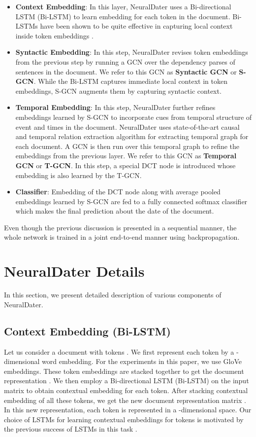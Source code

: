 \documentclass[11pt,a4paper]{article}
\newcommand{\method}{NeuralDater}
\begin{document}
\begin{itemize}
	\item \textbf{Context Embedding}: In this layer, \method{} uses a Bi-directional LSTM (Bi-LSTM) to learn embedding for each token in the document. Bi-LSTMs have been shown to be quite effective in capturing local context inside token embeddings \cite{Sutskever:2014:SSL:2969033.2969173}.
	\item \textbf{Syntactic Embedding}: In this step, \method{} revises token embeddings from the previous step by running a GCN over the dependency parses of sentences in the document. We refer to this GCN as \textbf{Syntactic GCN} or \textbf{S-GCN}. While the Bi-LSTM captures immediate local context in token embeddings, S-GCN augments them by capturing syntactic context. 
	\item \textbf{Temporal Embedding}: In this step, \method{} further refines embeddings learned by S-GCN to incorporate cues from temporal structure of event and times in the document. \method{} uses state-of-the-art causal and temporal relation extraction algorithm \cite{catena_paper} for extracting temporal graph for each document. A GCN is then run over this temporal graph to refine the embeddings from the previous layer. We refer to this GCN as \textbf{Temporal GCN} or \textbf{T-GCN}. In this step, a special DCT node is introduced whose embedding is also learned by the T-GCN.
	\item \textbf{Classifier}: Embedding of the DCT node along with average pooled embeddings learned by S-GCN are fed to a fully connected softmax classifier which makes the final prediction about the date of the document.
\end{itemize}

Even though the previous discussion is presented in a sequential manner, the whole network is trained in a joint end-to-end manner using backpropagation.

%
 \section{\method{} Details}

In this section, we present detailed description of various components of \method{}.

\subsection{Context Embedding (Bi-LSTM)}
\label{sec:et_gcn}

Let us consider a document  with  tokens  .
We first represent each token by a -dimensional word embedding. For the experiments in this paper, we use GloVe \cite{glove} embeddings. These token embeddings are stacked together to get the document representation . We then employ a Bi-directional LSTM (Bi-LSTM) \cite{lstm_1997} on the input matrix  to obtain contextual embedding for each token. After stacking contextual embedding of all these tokens, we get the new document representation matrix . In this new representation, each token is represented in a -dimensional space. Our choice of LSTMs for learning contextual embeddings for tokens is motivated by the previous success of LSTMs in this task \cite{Sutskever:2014:SSL:2969033.2969173}.
\end{document}
